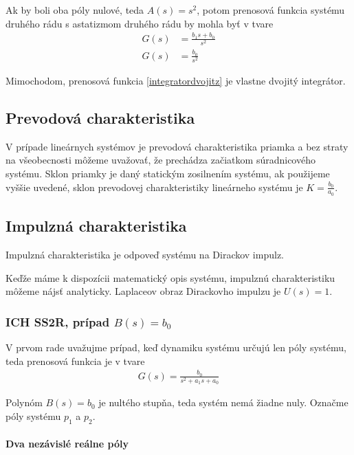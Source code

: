 \documentclass[a4paper, 10pt, ]{article}
\begin{document}
Ak by boli oba póly nulové, teda $A(s) = s^2$, potom prenosová funkcia systému druhého rádu s astatizmom druhého rádu by mohla byť v tvare
\begin{subequations}
    \begin{align}
        G(s) &= \frac{b_1 s + b_0}{s^2} \\
        G(s) &= \frac{b_0}{s^2} \label{integratordvojitz}
    \end{align}
\end{subequations}

Mimochodom, prenosová funkcia \eqref{integratordvojitz} je vlastne dvojitý integrátor.




\subsection{Prevodová charakteristika}

V prípade lineárnych systémov je prevodová charakteristika priamka a bez straty na všeobecnosti môžeme uvažovať, že prechádza začiatkom súradnicového systému. Sklon priamky je daný statickým zosilnením systému, ak použijeme vyššie uvedené, sklon prevodovej charakteristiky lineárneho systému je $K = \frac{b_0}{a_0}$.


\subsection{Impulzná charakteristika}

Impulzná charakteristika je odpoveď systému na Dirackov impulz.

Keďže máme k dispozícii matematický opis systému, impulznú charakteristiku môžeme nájsť analyticky. Laplaceov obraz Dirackovho impulzu je $U(s) = 1$.


\subsubsection{ICH SS2R, prípad $B(s) = b_0$}

V prvom rade uvažujme prípad, keď dynamiku systému určujú len póly systému, teda prenosová funkcia je v tvare
\begin{align}
    G(s) =  \frac{b_0}{s^2 + a_1 s + a_0}
\end{align}

Polynóm $B(s) = b_0$ je nultého stupňa, teda systém nemá žiadne nuly. Označme póly systému $p_1$ a $p_2$. 



\paragraph{Dva nezávislé reálne póly}
\end{document}
